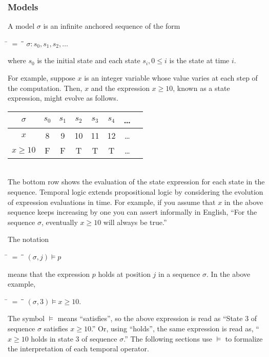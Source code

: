 \documentclass[12pt, fleqn, leqno]{article}
\newcommand{\lllgap}{12pt}                          %
\newcommand{\mymathindent}{24pt}                    %
\newcommand{\myqedtab}{\hspace{384pt}}              %
\begin{document}
\subsubsection{Models}

A model $\sigma$ is an infinite anchored sequence \cite{Schn} of the form
\begin{tabbing}
\hspace{\mymathindent} \= $= \;$ \= \myqedtab \= \kill
  \> $\sigma: s_0, s_1, s_2, \dots$
\end{tabbing}
where $s_0$ is the initial state and each state $s_i, 0 \le i$ is the state at time $i$.

For example, suppose $x$ is an integer variable whose value varies at each step of the computation.
Then, $x$ and the expression $x\ge 10$, known as a state expression, might evolve as follows.\\[\lllgap]
\begin{tabular}{c|ccccccc}
  $\sigma$      & $s_0$ & $s_1$ & $s_2$ & $s_3$ & $s_4$ & \dots \\
  \hline
  $x$           & 8     & 9     & 10    & 11    & 12    & \dots\\
  $x\ge 10$     & F     & F     & T     & T     & T     & \dots
\end{tabular}\\[\lllgap]
The bottom row shows the evaluation of the state expression for each state in the sequence.
Temporal logic extends propositional logic by considering the evolution of expression evaluations in time.
For example, if you assume that $x$ in the above sequence keeps increasing by one you can assert
informally in English, ``For the sequence $\sigma$, eventually $x\ge 10$ will always be true.''

The notation
\begin{tabbing}
\hspace{\mymathindent} \= $= \;$ \= \myqedtab \= \kill
  \> $(\sigma, j) \models p$
\end{tabbing}
means that the expression $p$ holds at position $j$ in a sequence $\sigma$.
In the above example,
\begin{tabbing}
\hspace{\mymathindent} \= $= \;$ \= \myqedtab \= \kill
  \> $(\sigma, 3) \models x\ge 10$.
\end{tabbing}
The symbol $\models$ means ``satisfies'', so the above expression is read as
``State 3 of sequence $\sigma$ satisfies $x\ge 10$.''
Or, using ``holds'', the same expression is read as, ``$x\ge 10$ holds in state 3 of sequence $\sigma$.''
The following sections use $\models$ to formalize the interpretation of each temporal operator.
\end{document}
